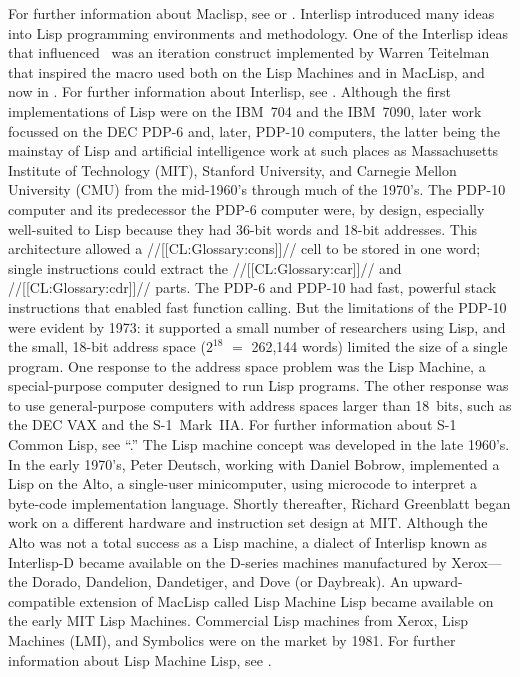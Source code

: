 For further information about Maclisp,  see {\Moonual} or {\Pitmanual}.
  Interlisp introduced many ideas into Lisp programming environments and methodology. One of the Interlisp ideas that influenced \clisp\ was an iteration construct implemented by Warren Teitelman that inspired the  macro used both on the Lisp Machines and in MacLisp, and now in \clisp. For further information about Interlisp, see {\InterlispManual}.
  Although the first implementations of Lisp were on the IBM~704 and the IBM~7090, later work focussed on the DEC PDP-6 and, later, PDP-10 computers, the latter being the mainstay of Lisp and artificial intelligence work at such places as  Massachusetts Institute of Technology (MIT), Stanford University, and  Carnegie Mellon University (CMU) from the mid-1960's through much of the 1970's. The PDP-10 computer and its predecessor the PDP-6 computer were, by design, especially well-suited to Lisp because they had 36-bit words and 18-bit addresses. This architecture allowed a //[[CL:Glossary:cons]]// cell to be stored in one word; single instructions could extract the  //[[CL:Glossary:car]]// and //[[CL:Glossary:cdr]]// parts.  The PDP-6 and PDP-10 had fast, powerful stack instructions that enabled fast function calling. But the limitations of the PDP-10 were evident by 1973: it supported a small number of researchers using Lisp, and the small, 18-bit address space ($2^{18}$ $=$ 262,144 words) limited the size of a single program. One response to the address space problem was the Lisp Machine, a special-purpose computer designed to run Lisp programs.  The other response was to use general-purpose computers with address spaces larger than 18~bits, such as the DEC VAX and the \hbox{S-1}~Mark~IIA. For further information about S-1 Common Lisp, see ``{\SOneCLPaper}.''
  The Lisp machine concept was developed in the late 1960's.  In the early 1970's, Peter Deutsch, working with  Daniel Bobrow, implemented a Lisp on the Alto, a single-user minicomputer, using microcode to interpret a byte-code implementation language. Shortly thereafter, Richard Greenblatt began work on a different hardware and instruction set design at MIT. Although the Alto was not a total success as a Lisp machine, a dialect of Interlisp known as Interlisp-D became available on the D-series machines manufactured by Xerox---the Dorado, Dandelion, Dandetiger, and Dove (or Daybreak). An upward-compatible extension of MacLisp called Lisp Machine Lisp became available on the early MIT Lisp Machines. Commercial Lisp machines from Xerox, Lisp Machines (LMI), and Symbolics were on the market by 1981. For further information about Lisp Machine Lisp, see {\Chinual}.

